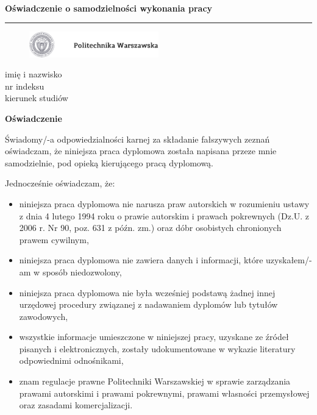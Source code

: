 


\newpage
\mbox{ }

\newpage
{\large \textbf{Oświadczenie o samodzielności wykonania pracy}}\\
{\color{sliwka}\rule[1pt]{\textwidth}{1.5pt}}

\vspace{0.6cm}

\begin{figure}[h!]
	\includegraphics[width=0.5\textwidth]{img/pw_logo_tekst.png}
\end{figure}

\vspace{0.6cm}
{\large imię i nazwisko}\\
nr indeksu\\
kierunek studiów\\

\begin{center}
	{\large \textbf{Oświadczenie}}
\end{center}

{\large Świadomy/-a odpowiedzialności karnej za składanie fałszywych zeznań oświadczam, że niniejsza praca dyplomowa została napisana przeze mnie samodzielnie, pod opieką kierującego pracą dyplomową.}


Jednocześnie oświadczam, że:
\begin{itemize}
	\item niniejsza praca dyplomowa nie narusza praw autorskich w rozumieniu ustawy z dnia 4 lutego 1994 roku o prawie autorskim i prawach pokrewnych (Dz.U. z 2006 r. Nr 90, poz. 631 z późn. zm.) oraz dóbr osobistych chronionych prawem cywilnym,
	\item niniejsza praca dyplomowa nie zawiera danych i informacji, które uzyskałem/-am w sposób niedozwolony,
	\item niniejsza praca dyplomowa nie była wcześniej podstawą żadnej innej urzędowej procedury związanej z nadawaniem dyplomów lub tytułów zawodowych,
	\item wszystkie informacje umieszczone w niniejszej pracy, uzyskane ze źródeł pisanych i elektronicznych, zostały udokumentowane w wykazie literatury odpowiednimi odnośnikami,
	\item znam regulacje prawne Politechniki Warszawskiej w sprawie zarządzania prawami autorskimi i prawami pokrewnymi, prawami własności przemysłowej oraz zasadami komercjalizacji.
\end{itemize}

